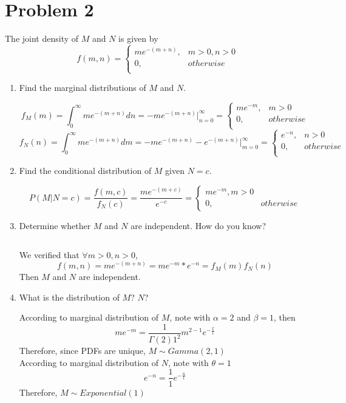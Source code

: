 \documentclass[11pt]{article}
\begin{document}
\section*{Problem 2}
The joint density of $M$ and $N$ is given by
\[
  f(m,n) =
  \begin{cases}
    me^{-(m+n)}, & m>0, n>0\\
    0, & otherwise\\
  \end{cases}
\]
\begin{enumerate}
  \item Find the marginal distributions of $M$ and $N$.
  \begin{solution}
    \[
      f_M(m) = \int_{0}^{\infty} me^{-(m+n)} dn = -me^{-(m+n)} \big|_{n=0}^{\infty} =
      \begin{cases}
         me^{-m}, & m>0 \\
         0, & otherwise \\
      \end{cases}
    \]
    \[
      f_N(n) = \int_{0}^{\infty} me^{-(m+n)} dm = -me^{-(m+n)} - e^{-(m+n)} \big|_{m=0}^{\infty} =
      \begin{cases}
        e^{-n}, & n > 0  \\
        0, & otherwise \\
      \end{cases}
    \]
  \end{solution}
  \item Find the conditional distribution of $M$ given $N=c$.
  \begin{solution}
    $ $\\
    \[
      P(M | N = c) = \frac{f(m, c)}{f_N(c)} = \frac{me^{-(m+c)}}{e^{-c}} =
      \begin{cases}
        me^{-m}, m>0\\
        0, & otherwise
      \end{cases}
    \]
  \end{solution}
  \item Determine whether $M$ and $N$ are independent. How do you know?
  \begin{solution}
    $ $\\
  \end{solution}
  We verified that $\forall m > 0, n>0$,
  \[
    f(m, n) = me^{-(m+n)} = me^{-m} * e^{-n} = f_M(m) f_N(n)
  \]
  Then $M$ and $N$ are independent.
  \item What is the distribution of $M$? $N$?
  \begin{solution}
    $ $\\
    According to marginal distribution of $M$, note with $\alpha = 2$ and $\beta = 1$, then
    \[
      me^{-m} = \frac{1}{\Gamma{(2)}1^2}m^{2-1}e^{-\frac{x}{1}}
    \]
    Therefore, since PDFs are unique, $M \sim Gamma(2,1)$\\
    According to marginal distribution of $N$, note with $\theta=1$
    \[
      e^{-n} = \frac{1}{1}e^{-\frac{n}{1}}
    \]
    Therefore, $M \sim Exponential(1)$
  \end{solution}
\end{enumerate}
\end{document}
